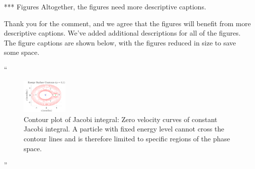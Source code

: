 \documentclass[11pt]{article}
\newenvironment{correction}{\begin{list}{}{\setlength{\leftmargin}{1cm}\setlength{\rightmargin}{1cm}}\vspace{\parsep}\item[]``}{''\end{list}}
\begin{document}
\begin{enumerate}
\item
    \begin{itshape}
*** Figures
Altogether, the figures need more descriptive captions.  
\end{itshape}

Thank you for the comment, and we agree that the figures will benefit from more descriptive captions.
We've added additional descriptions for all of the figures.
The figure captions are shown below, with the figures reduced in size to save some space.

\begin{correction}
\begin{figure}[H]
        \centering
        \includegraphics[width=0.2\textwidth]{energy_contours}
        \caption{Contour plot of Jacobi integral: Zero velocity curves of constant Jacobi integral. A particle with fixed energy level cannot cross the contour lines and is therefore limited to specific regions of the phase space. }
\end{figure} 


\begin{figure}[H]
        \centering
        \begin{scaletikzpicturetowidth}{0.2\textwidth}
\end{scaletikzpicturetowidth}
\end{figure}
\end{correction}
\end{enumerate}
\end{document}
